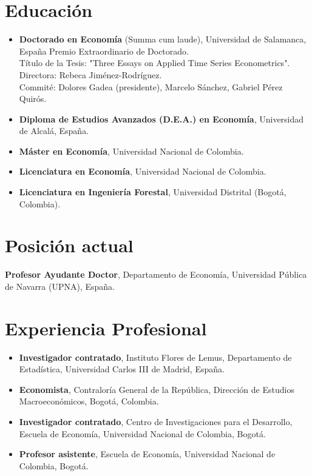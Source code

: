 \documentclass[11pt]{article}\usepackage[]{graphicx}\usepackage[]{color}
\begin{document}
{%
\section{Educación} 

\begin{itemize}
  \item {\textbf{Doctorado en Economía} (Summa cum laude), Universidad de Salamanca, España
  Premio Extraordinario de Doctorado.\\
  Título de la Tesis: "Three Essays on Applied Time Series Econometrics".\\
  Directora: Rebeca Jiménez-Rodríguez.\\
  Commité: Dolores Gadea (presidente), Marcelo Sánchez, Gabriel Pérez Quirós}.
  \item \textbf{Diploma de Estudios Avanzados (D.E.A.) en Economía}, Universidad de Alcalá, España.
  \item \textbf{Máster en Economía}, Universidad Nacional de Colombia.
  \item \textbf{Licenciatura en Economía}, Universidad Nacional de Colombia.
  \item \textbf{Licenciatura en Ingeniería Forestal}, Universidad Distrital (Bogotá, Colombia).
\end{itemize}


\section{Posición actual} 

\textbf{Profesor Ayudante Doctor}, Departamento de Economía, Universidad Pública de Navarra (UPNA), España.\\

\vspace{10pt}

\section{Experiencia Profesional} 

\begin{itemize}
  \item \textbf{Investigador contratado}, Instituto Flores de Lemus, Departamento de Estadística, Universidad Carlos III de Madrid, España.
  \item \textbf{Economista}, Contraloría General de la República, Dirección de Estudios Macroeconómicos, Bogotá, Colombia.
  \item \textbf{Investigador contratado}, Centro de Investigaciones para el Desarrollo, Escuela de Economía, Universidad Nacional de Colombia, Bogotá.
  \item \textbf{Profesor asistente}, Escuela de Economía, Universidad Nacional de Colombia, Bogotá.
\end{itemize}

}
\end{document}
